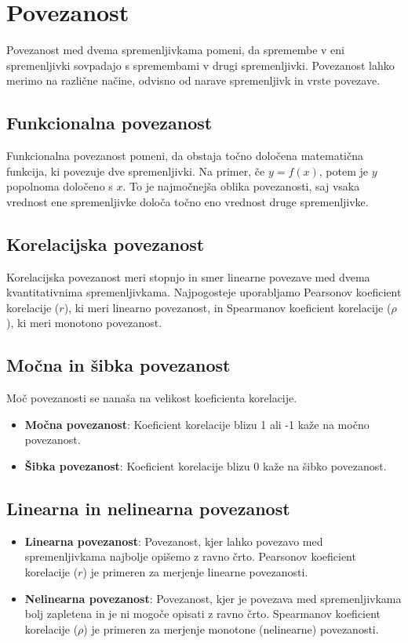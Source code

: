 \section{Povezanost}

Povezanost med dvema spremenljivkama pomeni, da spremembe v eni spremenljivki sovpadajo s spremembami v drugi spremenljivki. Povezanost lahko merimo na različne načine, odvisno od narave spremenljivk in vrste povezave.

\subsection*{Funkcionalna povezanost}
Funkcionalna povezanost pomeni, da obstaja točno določena matematična funkcija, ki povezuje dve spremenljivki. Na primer, če $y = f(x)$, potem je $y$ popolnoma določeno s $x$. To je najmočnejša oblika povezanosti, saj vsaka vrednost ene spremenljivke določa točno eno vrednost druge spremenljivke.

\subsection*{Korelacijska povezanost}
Korelacijska povezanost meri stopnjo in smer linearne povezave med dvema kvantitativnima spremenljivkama. Najpogosteje uporabljamo Pearsonov koeficient korelacije ($r$), ki meri linearno povezanost, in Spearmanov koeficient korelacije ($\rho$), ki meri monotono povezanost.

\subsection*{Močna in šibka povezanost}
Moč povezanosti se nanaša na velikost koeficienta korelacije. 
\begin{itemize}
    \item \textbf{Močna povezanost}: Koeficient korelacije blizu 1 ali -1 kaže na močno povezanost.
    \item \textbf{Šibka povezanost}: Koeficient korelacije blizu 0 kaže na šibko povezanost.
\end{itemize}

\subsection*{Linearna in nelinearna povezanost}
\begin{itemize}
    \item \textbf{Linearna povezanost}: Povezanost, kjer lahko povezavo med spremenljivkama najbolje opišemo z ravno črto. Pearsonov koeficient korelacije ($r$) je primeren za merjenje linearne povezanosti.
    \item \textbf{Nelinearna povezanost}: Povezanost, kjer je povezava med spremenljivkama bolj zapletena in je ni mogoče opisati z ravno črto. Spearmanov koeficient korelacije ($\rho$) je primeren za merjenje monotone (nelinearne) povezanosti.
\end{itemize}

